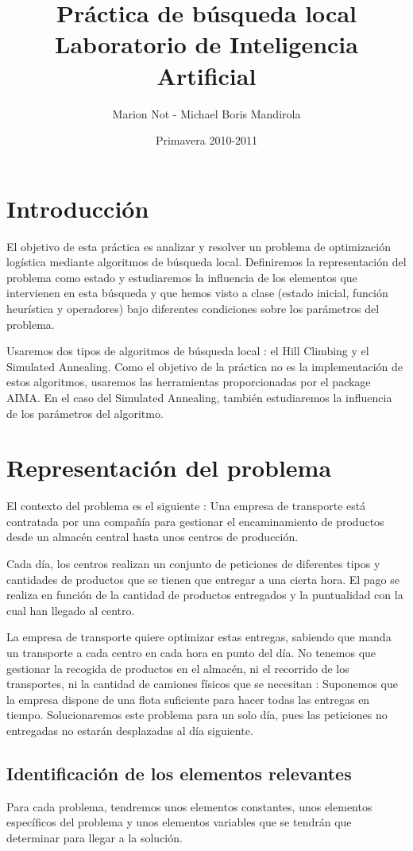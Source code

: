 \documentclass{article}
\title{\Huge{Práctica de búsqueda local} \\
\vspace{15mm}
   \Large{Laboratorio de Inteligencia Artificial}}
\author{Marion Not - Michael Boris Mandirola}
\date{Primavera 2010-2011}
\begin{document}
\maketitle
\newpage
\tableofcontents
\newpage
\section*{Introducción}
El objetivo de esta práctica es analizar y resolver un problema de optimización
logística mediante algoritmos de búsqueda local. Definiremos la representación
del problema como estado y estudiaremos la influencia de los elementos que
intervienen en esta búsqueda y que hemos visto a clase (estado inicial, función
heurística y operadores) bajo diferentes condiciones sobre los parámetros del
problema.

Usaremos dos tipos de algoritmos de búsqueda local : el Hill Climbing y el
Simulated Annealing. Como el objetivo de la práctica no es la implementación de
estos algoritmos, usaremos las herramientas proporcionadas por el package AIMA. 
En el caso del Simulated Annealing, también estudiaremos la influencia de los 
parámetros del algoritmo.

\section{Representación del problema}
El contexto del problema es el siguiente : Una empresa de transporte está
contratada por una compañía para gestionar el encaminamiento de productos desde
un almacén central hasta unos centros de producción.

Cada día, los centros realizan un conjunto de peticiones de diferentes tipos y 
cantidades de productos que se tienen que entregar a una cierta hora. El pago se
realiza en función de la cantidad de productos entregados y la puntualidad con
la cual han llegado al centro.

La empresa de transporte quiere optimizar estas entregas, sabiendo que manda un
transporte a cada centro en cada hora en punto del día.
No tenemos que gestionar la recogida de productos en el almacén, ni el recorrido
de los transportes, ni la cantidad de camiones físicos que se necesitan :
Suponemos que la empresa dispone de una flota suficiente para hacer todas las
entregas en tiempo.
Solucionaremos este problema para un solo día, pues las peticiones no entregadas
no estarán desplazadas al día siguiente.

\subsection{Identificación de los elementos relevantes}
Para cada problema, tendremos unos elementos constantes, unos elementos
específicos del problema y unos elementos variables que se tendrán que
determinar para llegar a la solución.
\end{document}
